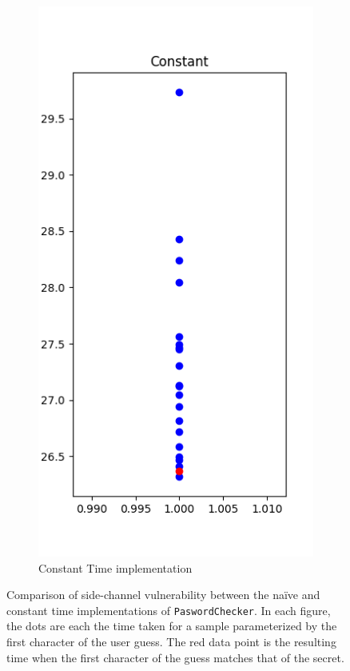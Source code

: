 \begin{figure}[h]
\begin{subfigure}{.5\textwidth}
  \centering
  \includegraphics[width=.7\linewidth]{figures/constant0.png}
  \caption{Constant Time implementation}
  \label{fig:sub2}
\end{subfigure}
\caption{Comparison of side-channel vulnerability between the na\"ive and constant time implementations of \texttt{PaswordChecker}. In each figure, the dots are each the time taken for a sample parameterized by the first character of the user guess. The red data point is the resulting time when the first character of the guess matches that of the secret.}
\label{fig:test}
\end{figure}

